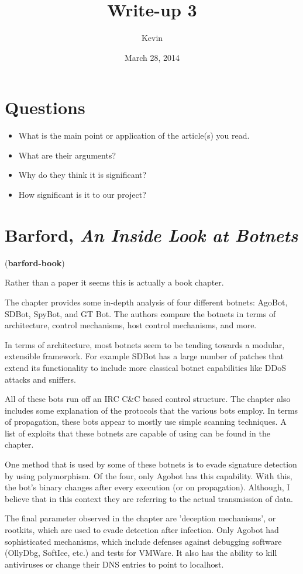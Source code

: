 \documentclass{article}
\title{Write-up 3}
\author{Kevin}
\date{March 28, 2014}
\begin{document}
	\maketitle

\section{Questions}
	\begin{itemize}
		\item What is the main point or application of the article(s) you read.
		\item What are their arguments?
		\item Why do they think it is significant?
		\item How significant is it to our project?
	\end{itemize}	
	\section{Barford, \emph{An Inside Look at Botnets}} (\textbf{barford-book})
		
	Rather than a paper it seems this is actually a book chapter.

	The chapter provides some in-depth analysis of four different botnets: AgoBot, SDBot, SpyBot, and GT Bot. The authors compare the botnets in terms of architecture, control mechanisms, host control mechanisms, and more.

	In terms of architecture, most botnets seem to be tending towards a modular, extensible framework. For example SDBot has a large number of patches that extend its functionality to include more classical botnet capabilities like DDoS attacks and sniffers.

	All of these bots run off an IRC C\&C based control structure. The chapter also includes some explanation of the protocols that the various bots employ. In terms of propagation, these bots appear to mostly use simple scanning techniques. A list of exploits that these botnets are capable of using can be found in the chapter.

	One method that is used by some of these botnets is to evade signature detection by using polymorphism. Of the four, only Agobot has this capability. With this, the bot's binary changes after every execution (or on propagation). Although, I believe that in this context they are referring to the actual transmission of data.

	The final parameter observed in the chapter are 'deception mechanisms', or rootkits, which are used to evade detection after infection. Only Agobot had sophisticated mechanisms, which include defenses against debugging software (OllyDbg, SoftIce, etc.) and tests for VMWare. It also has the ability to kill antiviruses or change their DNS entries to point to localhost.
\end{document}

